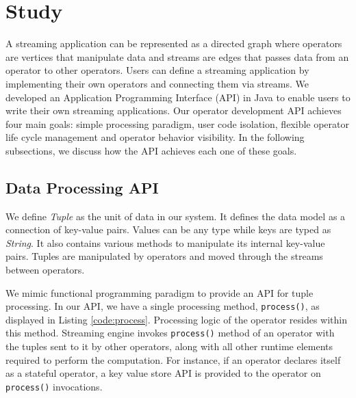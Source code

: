 \section{Study}\label{sec:study}
\lstset{language=JAVA}

A streaming application can be represented as a directed graph where operators are vertices that manipulate data and streams are edges that passes data from an operator to other operators. Users can define a streaming application by implementing their own operators and connecting them via streams. We developed an Application Programming Interface (API) in Java to enable users to write their own streaming applications. Our operator development API achieves four main goals: simple processing paradigm, user code isolation, flexible operator life cycle management and operator behavior visibility. In the following subsections, we discuss how the API achieves each one of these goals.

\subsection{Data Processing API}\label{sec:data-processing-api}

We define \textit{Tuple} as the unit of data in our system. It defines the data model as a connection of key-value pairs. Values can be any type while keys are typed as \textit{String}. It also contains various methods to manipulate its internal key-value pairs. Tuples are manipulated by operators and moved through the streams between operators.

We mimic functional programming paradigm to provide an API for tuple processing. In our API, we have a single processing method, \texttt{process()}, as displayed in Listing \ref{code:process}. Processing logic of the operator resides within this method. Streaming engine invokes \texttt{process()} method of an operator with the tuples sent to it by other operators, along with all other runtime elements required to perform the computation. For instance, if an operator declares itself as a stateful operator, a key value store API is provided to the operator on \texttt{process()} invocations. 


